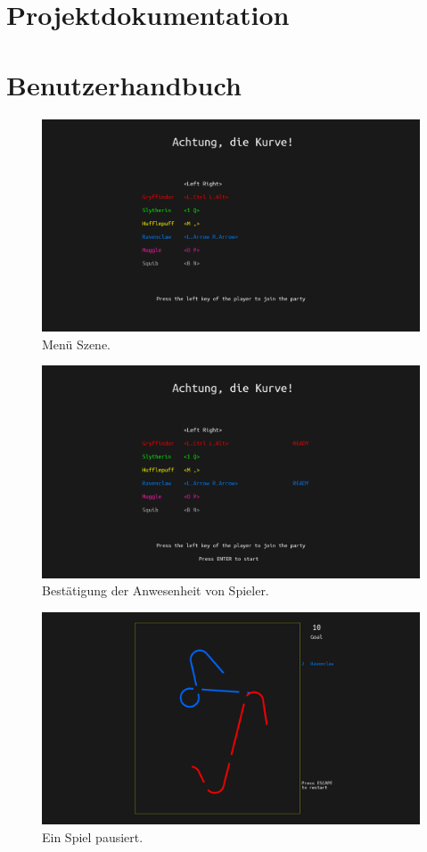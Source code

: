 \documentclass[doktyp=studarbeit]{TUBAFarbeiten}
\begin{document}
\section{Projektdokumentation}

\section{Benutzerhandbuch}

\begin{figure}[!htb]
	\centering
	\includegraphics[width=0.8\linewidth]{1.png}
	\caption{Menü Szene.}
	\label{fig:menu}
\end{figure}

\begin{figure}[!htb]
	\centering
	\includegraphics[width=0.8\linewidth]{2.png}
	\caption{Bestätigung der Anwesenheit von Spieler.}
	\label{fig:confirmation}
\end{figure}

\begin{figure}[!htb]
	\centering
	\includegraphics[width=0.8\linewidth]{5.png}
	\caption{Ein Spiel pausiert.}
	\label{fig:pause}
\end{figure}


\printbibliography[heading=bibintoc]
\end{document}
